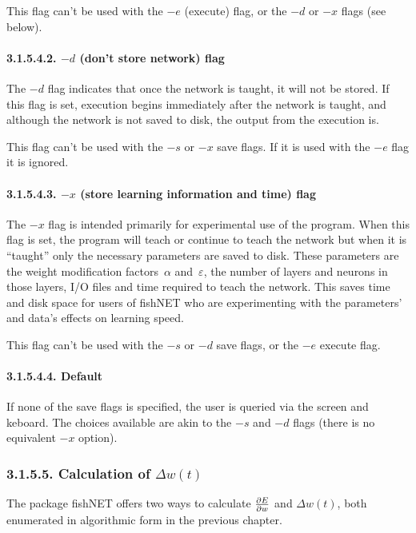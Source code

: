\documentclass[12pt]{report}
\begin{document}
This flag can't be used with the $-e$ (execute) flag, or the $-d$ or
$-x$ flags (see below).

\paragraph{3.1.5.4.2. $-d$ (don't store network) flag}

The $-d$ flag indicates that once the network is taught, it will not
be stored.
If this flag is set, execution begins immediately after the network
is taught, and although the network is not saved to disk, the output
from the execution is.

This flag can't be used with the $-s$ or $-x$ save flags. If it is
used with the $-e$ flag it is ignored.

\paragraph{3.1.5.4.3. $-x$ (store learning information and time) flag}

The $-x$ flag is intended primarily for experimental use of the
program.
When this flag is set, the program will teach or continue to teach
the network but when it is ``taught'' only the necessary parameters
are saved to disk.
These parameters are the weight modification factors~$\alpha$
and~$\varepsilon$, the number of layers and neurons in those layers,
I/O files and time required to teach the network.
This saves time and disk space for users of fishNET who are
experimenting with the parameters' and data's effects on
learning speed.

This flag can't be used with the $-s$ or $-d$ save flags, or the
$-e$ execute flag.

\paragraph{3.1.5.4.4. Default}

If none of the save flags is specified, the user is queried via the
screen and keboard. The choices available are akin to the $-s$ and
$-d$ flags (there is no equivalent $-x$ option).

\subsubsection{3.1.5.5. Calculation of $\Delta w(t)$}

The package fishNET offers two ways to calculate $\partial E \over
\partial w$ and $\Delta w(t)$, both enumerated in algorithmic form
in the previous chapter.
\end{document}
